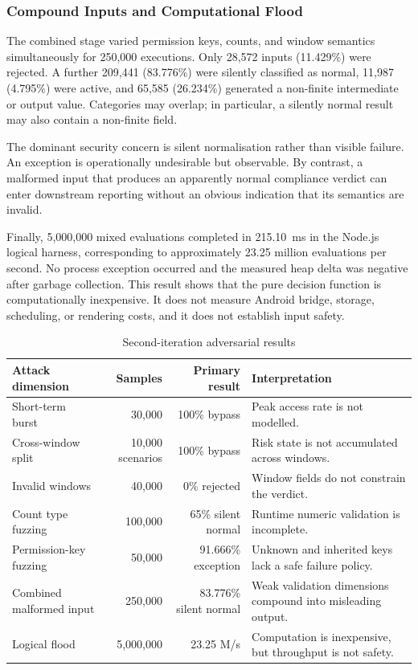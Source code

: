 \subsubsection{Compound Inputs and Computational Flood}

The combined stage varied permission keys, counts, and window semantics simultaneously for 250,000 executions. Only 28,572 inputs (11.429\%) were rejected. A further 209,441 (83.776\%) were silently classified as normal, 11,987 (4.795\%) were active, and 65,585 (26.234\%) generated a non-finite intermediate or output value. Categories may overlap; in particular, a silently normal result may also contain a non-finite field.

The dominant security concern is silent normalisation rather than visible failure. An exception is operationally undesirable but observable. By contrast, a malformed input that produces an apparently normal compliance verdict can enter downstream reporting without an obvious indication that its semantics are invalid.

Finally, 5,000,000 mixed evaluations completed in 215.10~ms in the Node.js logical harness, corresponding to approximately 23.25 million evaluations per second. No process exception occurred and the measured heap delta was negative after garbage collection. This result shows that the pure decision function is computationally inexpensive. It does not measure Android bridge, storage, scheduling, or rendering costs, and it does not establish input safety.

\begin{table}[H]
\centering
\caption{Second-iteration adversarial results}
\label{tab:ch5-second-iteration}
\small
\begin{tabular}{p{3.0cm}rrp{5.8cm}}
\toprule
\textbf{Attack dimension} & \textbf{Samples} & \textbf{Primary result} & \textbf{Interpretation} \\
\midrule
Short-term burst & 30,000 & 100\% bypass & Peak access rate is not modelled. \\
Cross-window split & 10,000 scenarios & 100\% bypass & Risk state is not accumulated across windows. \\
Invalid windows & 40,000 & 0\% rejected & Window fields do not constrain the verdict. \\
Count type fuzzing & 100,000 & 65\% silent normal & Runtime numeric validation is incomplete. \\
Permission-key fuzzing & 50,000 & 91.666\% exception & Unknown and inherited keys lack a safe failure policy. \\
Combined malformed input & 250,000 & 83.776\% silent normal & Weak validation dimensions compound into misleading output. \\
Logical flood & 5,000,000 & 23.25 M/s & Computation is inexpensive, but throughput is not safety. \\
\bottomrule
\end{tabular}
\end{table}

